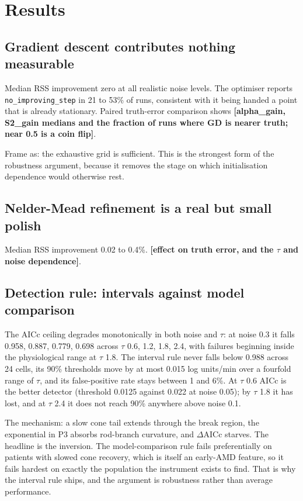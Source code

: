 \documentclass[11pt,a4paper]{article}
\newcommand{\FILL}[1]{\textbf{\textcolor{coneC}{[#1]}}}
\begin{document}
\section{Results}

\subsection{Gradient descent contributes nothing measurable}
\label{sec:gd}
\begin{evidence}
Median RSS improvement zero at all realistic noise levels. The optimiser
reports \texttt{no\_improving\_step} in 21 to 53\% of runs, consistent with
it being handed a point that is already stationary. Paired truth-error
comparison shows \FILL{alpha\_gain, S2\_gain medians and the fraction of
runs where GD is nearer truth; near 0.5 is a coin flip}.
\end{evidence}
\begin{towrite}
Frame as: the exhaustive grid is sufficient. This is the strongest form of
the robustness argument, because it removes the stage on which
initialisation dependence would otherwise rest.
\end{towrite}

\subsection{Nelder-Mead refinement is a real but small polish}
\begin{evidence}
Median RSS improvement 0.02 to 0.4\%. \FILL{effect on truth error, and the
$\tau$ and noise dependence}.
\end{evidence}

\subsection{Detection rule: intervals against model comparison}
\label{sec:rule}
\begin{evidence}
The AICc ceiling degrades monotonically in both noise and $\tau$: at noise
0.3 it falls 0.958, 0.887, 0.779, 0.698 across $\tau$ 0.6, 1.2, 1.8, 2.4,
with failures beginning inside the physiological range at $\tau$ 1.8. The
interval rule never falls below 0.988 across 24 cells, its 90\% thresholds
move by at most 0.015 log units/min over a fourfold range of $\tau$, and its
false-positive rate stays between 1 and 6\%. At $\tau$ 0.6 AICc is the better
detector (threshold 0.0125 against 0.022 at noise 0.05); by $\tau$ 1.8 it has
lost, and at $\tau$ 2.4 it does not reach 90\% anywhere above noise 0.1.
\end{evidence}
\begin{towrite}
The mechanism: a slow cone tail extends through the break region, the
exponential in P3 absorbs rod-branch curvature, and $\Delta$AICc starves.
The headline is the inversion. The model-comparison rule fails preferentially
on patients with slowed cone recovery, which is itself an early-AMD feature,
so it fails hardest on exactly the population the instrument exists to find.
That is why the interval rule ships, and the argument is robustness rather
than average performance.
\end{towrite}
\end{document}
